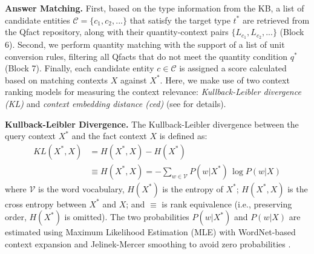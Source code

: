 \noindent \textbf{Answer Matching.} First, based on the type information from the KB, a list of candidate entities $\mathcal{C} = \{c_1,c_2,...\}$ that satisfy the target type $t^*$ are retrieved from the Qfact repository, along with their quantity-context pairs $\{L_{c_1},L_{c_2},...\}$ (Block 6). Second, we perform quantity matching with the support of a list of unit conversion rules, filtering all Qfacts that do not meet the quantity condition $q^*$ (Block 7).
Finally, each candidate entity $c \in \mathcal{C}$ is assigned a score calculated based on matching contexts $X$ against $X^*$. 
Here, we make use of two context ranking models for measuring the context relevance: \textit{Kullback-Leibler divergence (KL)} and \textit{context embedding distance (ced)} (see \citep{HoISWC2019} for details).

 



\noindent \textbf{Kullback-Leibler Divergence.} The Kullback-Leibler divergence between the query context $X^*$ and the fact context $X$ is defined as:
\begin{align*}
\textit{KL}(X^*, X) &= H(X^*, X) - H(X^*) \\ &\equiv H(X^*, X) 
= -\sum_{w \in \mathcal{V}} P(w|X^*)\,\log P(w|X)
\end{align*}
where $\mathcal{V}$ is the word vocabulary, $H(X^*)$ is the entropy of $X^*$; $H(X^*, X)$ is the cross entropy between $X^*$ and $X$; and $\equiv$ is rank equivalence
(i.e., preserving order, $H(X^*)$ is omitted). 
The two probabilities $P(w|X^*)$ and $P(w|X)$ 
are estimated using Maximum Likelihood Estimation (MLE) with WordNet-based context expansion and Jelinek-Mercer smoothing to avoid zero probabilities \cite{HoISWC2019}.

%

